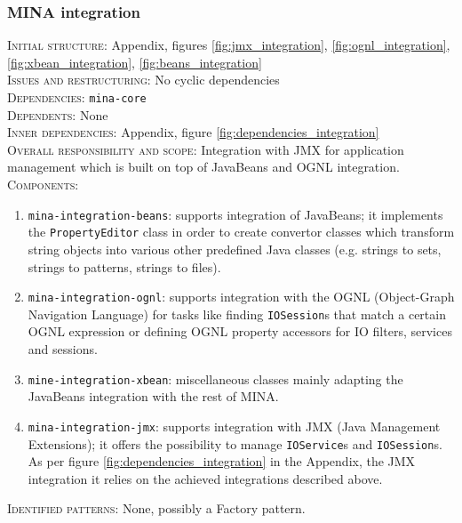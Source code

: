 \subsubsection{MINA integration}
\textsc{Initial structure}: Appendix, figures \ref{fig:jmx_integration}, \ref{fig:ognl_integration}, \ref{fig:xbean_integration}, \ref{fig:beans_integration} \\
\textsc{Issues and restructuring}: No cyclic dependencies\\
\textsc{Dependencies}: \texttt{mina-core}\\
\textsc{Dependents}: None\\
\textsc{Inner dependencies}: Appendix, figure \ref{fig:dependencies_integration}\\
\textsc{Overall responsibility and scope}: Integration with JMX for application management which is built on top of JavaBeans and OGNL integration.\\
\textsc{Components}:
\begin{enumerate}
    \item \texttt{mina-integration-beans}: supports integration of JavaBeans; it implements the \texttt{PropertyEditor} class in order to create convertor classes which transform string objects into various other predefined Java classes (e.g. strings to sets, strings to patterns, strings to files).
    \item \texttt{mina-integration-ognl}: supports integration with the OGNL (Object-Graph Navigation Language) for tasks like finding \texttt{IOSession}s that match a certain OGNL expression or defining OGNL property accessors for IO filters, services and sessions.
    \item \texttt{mine-integration-xbean}: miscellaneous classes mainly adapting the JavaBeans integration with the rest of MINA. 
    \item \texttt{mina-integration-jmx}: supports integration with JMX (Java Management Extensions); it offers the possibility to manage \texttt{IOService}s and \texttt{IOSession}s. As per figure \ref{fig:dependencies_integration} in the Appendix, the JMX integration it relies on the achieved integrations described above.
\end{enumerate}
\textsc{Identified patterns}: None, possibly a Factory pattern.

